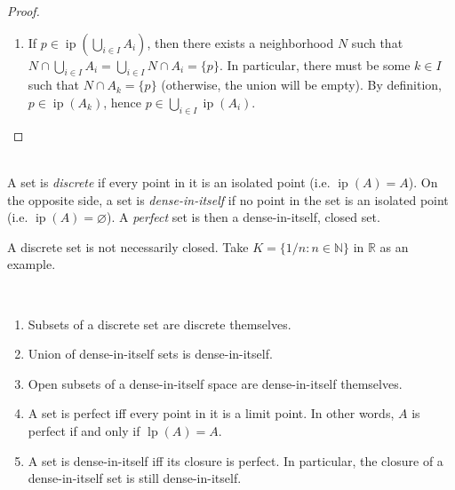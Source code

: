 \documentclass{treatise}
\begin{document}
\begin{proof}
\begin{enumerate}[label=(\alph*)]
    \item If $p \in \operatorname{ip} \left( \bigcup_{i \in I} A_i \right)$, then there exists a neighborhood $N$ such that $N \cap \bigcup_{i \in I} A_i = \bigcup_{i \in I} N \cap A_i = \{ p \}$. In particular, there must be some $k \in I$ such that $N \cap A_k = \{ p \}$ (otherwise, the union will be empty). By definition, $p \in \operatorname{ip}(A_k)$, hence $p \in \bigcup_{i \in I} \operatorname{ip}(A_i)$.
\end{enumerate}
\end{proof}
\ \\
A set is \emph{discrete} if every point in it is an isolated point (i.e. $\operatorname{ip}(A) = A$). On the opposite side, a set is \emph{dense-in-itself} if no point in the set is an isolated point (i.e. $\operatorname{ip}(A) = \varnothing$). A \emph{perfect} set is then a dense-in-itself, closed set.
\begin{remark}
A discrete set is not necessarily closed. Take $K = \{ 1/n : n \in \mathbb{N} \}$ in $\mathbb{R}$ as an example.
\end{remark}
\begin{proposition} \ 
\begin{enumerate}
    \item Subsets of a discrete set are discrete themselves.
    \item Union of dense-in-itself sets is dense-in-itself.
    \item Open subsets of a dense-in-itself space are dense-in-itself themselves.
    \item A set is perfect iff every point in it is a limit point. In other words, $A$ is perfect if and only if $\operatorname{lp}(A) = A$.
    \item A set is dense-in-itself iff its closure is perfect. In particular, the closure of a dense-in-itself set is still dense-in-itself.
\end{enumerate}
\end{proposition}
\end{document}
